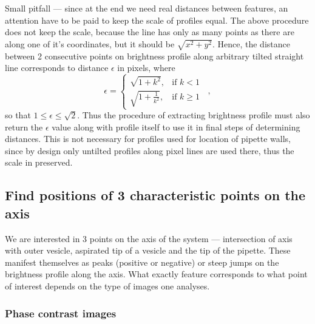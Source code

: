 \documentclass[a4paper,12pt]{article}
\begin{document}
Small pitfall --- since at the end we need real distances between features, an attention have to be paid to keep the scale of profiles equal. The above procedure does not keep the scale, because the line has only as many points as there are along one of it's coordinates, but it should be $\sqrt{x^2+y^2}$. Hence, the distance between 2 consecutive points on brightness profile along arbitrary tilted straight line corresponds to distance $\epsilon$ in pixels, where
\begin{equation}
\epsilon = \left\{
\begin{array}{ll}
	\sqrt{1+k^2},&\text{if }k < 1\\
	\sqrt{1+\frac{1}{k^2}},&\text{if } k \geq 1 
\end{array}
\right.\;\;,
\label{eq:profilescale}
\end{equation}
so that $1 \leq \epsilon \leq \sqrt{2}$. Thus the procedure of extracting brightness profile must also return the $\epsilon$ value along with profile itself to use it in final steps of determining distances. This is not necessary for profiles used for location of pipette walls, since by design only untilted profiles along pixel lines are used there, thus the scale in preserved.

\subsection{Find positions of 3 characteristic points on the axis}\label{points}

We are interested in 3 points on the axis of the system --- intersection of axis with outer vesicle, aspirated tip of a vesicle and the tip of the pipette. These manifest themselves as peaks (positive or negative) or steep jumps on the brightness profile along the axis. What exactly feature corresponds to what point of interest depends on the type of images one analyses.

\subsubsection{Phase contrast images}\label{phcfeatures}
\end{document}
